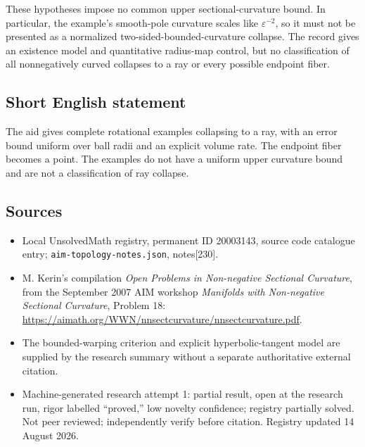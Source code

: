 \documentclass[11pt]{article}
\begin{document}
These hypotheses impose no common upper sectional-curvature bound. In particular, the example's smooth-pole curvature scales like $\varepsilon^{-2}$, so it must not be presented as a normalized two-sided-bounded-curvature collapse. The record gives an existence model and quantitative radius-map control, but no classification of all nonnegatively curved collapses to a ray or every possible endpoint fiber.
\subsection{Short English statement}
The aid gives complete rotational examples collapsing to a ray, with an error bound uniform over ball radii and an explicit volume rate. The endpoint fiber becomes a point. The examples do not have a uniform upper curvature bound and are not a classification of ray collapse.
\subsection{Sources}
\begin{itemize}
\item Local UnsolvedMath registry, permanent ID 20003143, source code catalogue entry; \texttt{aim-topology-notes.json}, notes[230].
\item M. Kerin's compilation \emph{Open Problems in Non-negative Sectional Curvature}, from the September 2007 AIM workshop \emph{Manifolds with Non-negative Sectional Curvature}, Problem 18: \url{https://aimath.org/WWN/nnsectcurvature/nnsectcurvature.pdf}.
\item The bounded-warping criterion and explicit hyperbolic-tangent model are supplied by the research summary without a separate authoritative external citation.
\item Machine-generated research attempt 1: partial result, open at the research run, rigor labelled ``proved,'' low novelty confidence; registry partially solved. Not peer reviewed; independently verify before citation. Registry updated 14 August 2026.
\end{itemize}
\end{document}
